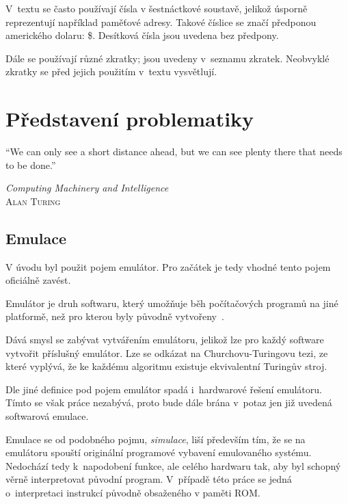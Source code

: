 \begin{note*}[Značení]
	V~textu se často používají čísla v šestnáctkové soustavě, jelikož úsporně reprezentují například paměťové adresy. Takové číslice se značí předponou amerického dolaru: \$. Desítková čísla jsou uvedena bez předpony.
	
	Dále se používají různé zkratky; jsou uvedeny v~seznamu zkratek. Neobvyklé zkratky se před jejich použitím v~textu vysvětlují.
\end{note*}

\chapter{Představení problematiky}
\label{chap:predstaveni-problematiky}

\epigraph{
	\enquote{We can only see a short distance ahead, but we can see plenty there that needs to be done.}
}{\textit{Computing Machinery and Intelligence}\\ \textsc{Alan Turing}}

\section{Emulace}
V úvodu byl použit pojem emulátor. Pro začátek je tedy vhodné tento pojem oficiálně zavést.

\begin{definition}[Emulátor]
	Emulátor je druh softwaru, který umožňuje běh počítačových programů na jiné platformě, než pro kterou byly původně vytvořeny~\cite{Wikipedia:emulator}.
\end{definition}

\begin{note}[Emulovatelnost]
	Dává smysl se zabývat vytvářením emulátoru, jelikož lze pro každý software vytvořit příslušný emulátor. Lze se odkázat na Churchovu-Turingovu tezi, ze které vyplývá, že ke každému algoritmu existuje ekvivalentní Turingův stroj.
\end{note}

Dle jiné definice pod pojem emulátor spadá i~hardwarové řešení emulátoru. Tímto se však práce nezabývá, proto bude dále brána v~potaz jen již uvedená softwarová emulace.

Emulace se od podobného pojmu, \emph{simulace}, liší především tím, že se na emulátoru spouští originální programové vybavení emulovaného systému. Nedochází tedy k~napodobení funkce, ale celého hardwaru tak, aby byl schopný věrně interpretovat původní program. V~případě této práce se jedná o~interpretaci instrukcí původně obsaženého v paměti ROM.

